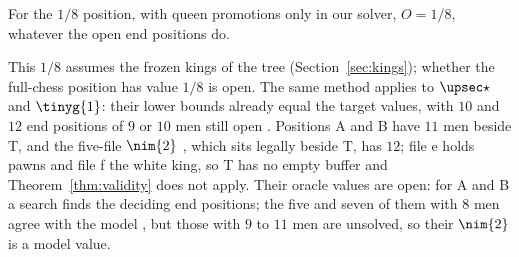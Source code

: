 \begin{proposition}
For the $1/8$ position, with queen promotions only in our solver, $O=1/8$, whatever the open end positions do.
\end{proposition}

This $1/8$ assumes the frozen kings of the tree (Section~\ref{sec:kings}); whether the full-chess position
has value $1/8$ is open. The same method applies to $\upsec\star$ and $\tinyg{1}$: their lower bounds already equal the
target values, with $10$ and $12$ end positions of $9$ or $10$ men still open . Positions A and B have $11$ men beside
T, and the five-file $\nim{2}$ , which sits legally
beside T, has $12$; file e holds pawns and file f the white king, so T has no empty buffer and Theorem~\ref{thm:validity} does not apply. Their oracle values are open: for A and B a
search finds the deciding end positions; the five and seven of them with $8$ men agree with the model
, but those with $9$ to $11$ men are unsolved, so their $\nim{2}$ is a model value.
